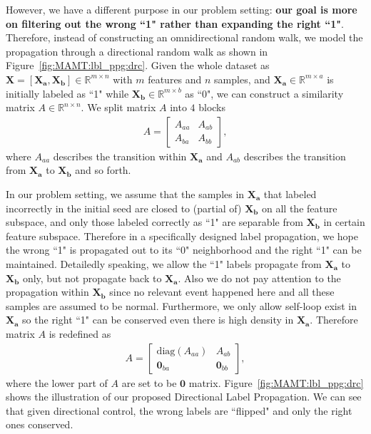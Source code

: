 However, we have a different purpose in our problem setting:  \textbf{our goal is more on filtering out the wrong ``1" rather than expanding the right ``1"}.  Therefore, instead of constructing an omnidirectional random walk,  we model the propagation through a directional random walk as shown in Figure~\ref{fig:MAMT:lbl_ppg:drc}. Given the whole dataset as $\textbf{X} = [\textbf{X}_\textbf{a}, \textbf{X}_\textbf{b}] \in \mathbb{R}^{m \times n}$ with $m$ features and $n$ samples, and $\textbf{X}_\textbf{a} \in \mathbb{R}^{m \times a}$ is initially labeled as ``1" while $\textbf{X}_\textbf{b} \in \mathbb{R}^{m \times b}$ as ``0", we can construct a similarity matrix $A \in \mathbb{R}^{n \times n}$. We split matrix $A$ into $4$ blocks
\begin{align}            
\label{eq1:MAMT:A_block:01}
A = 
\begin{bmatrix}
A_{aa}&A_{ab}\\
A_{ba}&A_{bb}
\end{bmatrix},
\end{align}
where $A_{aa}$ describes the transition within $\textbf{X}_\textbf{a}$ and $A_{ab}$ describes the transition from $\textbf{X}_\textbf{a}$ to $\textbf{X}_\textbf{b}$ and so forth. 

In our problem setting, we assume that the samples in $\textbf{X}_\textbf{a}$ that labeled incorrectly in the initial seed are closed to (partial of) $\textbf{X}_\textbf{b}$ on all the feature subspace, and only those labeled correctly as ``1" are separable from $\textbf{X}_\textbf{b}$ in certain feature subspace. Therefore in a specifically designed label propagation, we hope the wrong ``1" is propagated out to its ``0" neighborhood and the right ``1" can be maintained. Detailedly speaking, we allow the ``1" labels propagate from $\textbf{X}_\textbf{a}$ to $\textbf{X}_\textbf{b}$ only, but not propagate back to $\textbf{X}_\textbf{a}$. Also we do not pay attention to the propagation within $\textbf{X}_\textbf{b}$ since no relevant event happened here and all these samples are assumed to be normal. Furthermore, we only allow self-loop exist in $\textbf{X}_\textbf{a}$ so the right ``1" can be conserved even there is high density in $\textbf{X}_\textbf{a}$. Therefore matrix $A$ is redefined as 
\begin{align}            
\label{eq1:MAMT:A_block:02}
A = 
\begin{bmatrix}
\mathrm{diag}(A_{aa})&A_{ab}\\
\textbf{0}_{ba}&\textbf{0}_{bb}
\end{bmatrix},
\end{align}  
where the lower part of $A$ are set to be $\textbf{0}$ matrix. Figure~\ref{fig:MAMT:lbl_ppg:drc} shows the illustration of our proposed Directional Label Propagation. We can see that given directional control, the wrong labels are ``flipped" and only the right ones conserved. 

